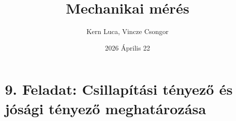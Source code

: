 \documentclass{article}
\title{Mechanikai mérés}
\author{Kern Luca, Vincze Csongor}
\date{2026 Április 22}
\begin{document}
\maketitle

\section{9. Feladat: Csillapítási tényező és jósági tényező meghatározása}
\end{document}
